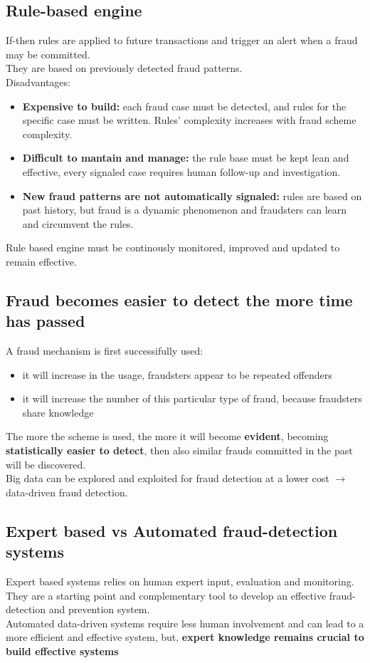     \subsection{Rule-based engine}
        If-then rules are applied to future transactions and trigger an alert when a fraud may be committed.\\
        They are based on previously detected fraud patterns.\\
        Disadvantages:
        \begin{itemize}
            \item \textbf{Expensive to build:} each fraud case must be detected, and rules for the specific case must be written. Rules' complexity increases with fraud scheme complexity.
            \item \textbf{Difficult to mantain and manage:} the rule base must be kept lean and effective, every signaled case requires human follow-up and investigation.
            \item \textbf{New fraud patterns are not automatically signaled:} rules are based on past history, but fraud is a dynamic phenomenon and fraudsters can learn and circumvent the rules.
        \end{itemize}
        Rule based engine must be continously monitored, improved and updated to remain effective.
    \subsection{Fraud becomes easier to detect the more time has passed}
        A fraud mechanism is first successifully used:
        \begin{itemize}
            \item it will increase in the usage, fraudsters appear to be repeated offenders
            \item it will increase the number of this particular type of fraud, because fraudsters share knowledge 
        \end{itemize} 
        The more the scheme is used, the more it will become \textbf{evident}, becoming \textbf{statistically easier to detect}, then also similar frauds committed in the past will be discovered.\\
        Big data can be explored and exploited for fraud detection at a lower cost $\rightarrow$ data-driven fraud detection.
    \subsection{Expert based vs Automated fraud-detection systems}
        Expert based systems relies on human expert input, evaluation and monitoring. They are a starting point and complementary tool to develop an effective fraud-detection and prevention system.\\
        Automated data-driven systems require less human involvement and can lead to a more efficient and effective system, but, \textbf{expert knowledge remains crucial to build effective systems}
